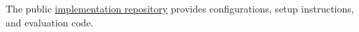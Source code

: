 The public \href{https://github.com/Peneplain/dl}{implementation repository} provides configurations, setup instructions, and evaluation code.
